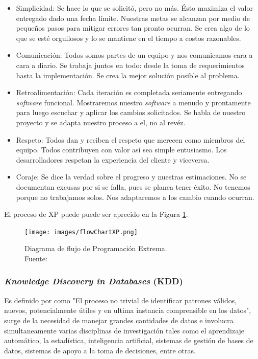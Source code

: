 \begin{itemize}
\item Simplicidad: Se hace lo que se solicitó, pero no más. Ésto maximiza el valor entregado dado una fecha límite. Nuestras metas se alcanzan por medio de pequeños pasos para mitigar errores tan pronto ocurran. Se crea algo de lo que se esté orgullosos y lo se mantiene en el tiempo a costos razonables.
\item Comunicación: Todos somos partes de un equipo y nos comunicamos cara a cara a diario. Se trabaja juntos en todo: desde la toma de requerimientos hasta la implementación. Se crea la mejor solución posible al problema.
\item Retroalimentación: Cada iteración es completada seriamente entregando \textit{software} funcional. Mostraremos nuestro \textit{software} a menudo y prontamente para luego escuchar y aplicar los cambios solicitados. Se habla de nuestro proyecto y se adapta nuestro proceso a el, no al revéz.
\item Respeto: Todos dan y reciben el respeto que merecen como miembros del equipo. Todos contribuyen con valor así sea simple entusiasmo. Los desarrolladores respetan la experiencia del cliente y viceversa. 
\item Coraje: Se dice la verdad sobre el progreso y nuestras estimaciones. No se documentan excusas por si se falla, pues se planea tener éxito. No tenemos porque no trabajamos solos. Nos adaptaremos a los cambio cuando ocurran.
\end{itemize}

El proceso de XP puede puede ser aprecido en la Figura \ref{fig:procesoXP}.

\begin{figure}[H]
	\centering
	\captionsetup{justification=centering}
	\texttt{[image: images/flowChartXP.png]}
	\caption[Diagrama de flujo de Programación Extrema.]{Diagrama de flujo de Programación Extrema.\\Fuente: \cite{XP}}
	\label{fig:procesoXP}
\end{figure}

\subsubsection*{\textit{Knowledge Discovery in Databases} (KDD)}
\label{subsubsec:kdd}

Es definido por \cite{KDDFayyad} como "El proceso no trivial de identificar patrones válidos, nuevos, potencialmente útiles y en ultima instancia comprensible en los datos", surge de la necesidad de manejar grandes cantidades de datos e involucra simultaneamente varias disciplinas de investigación tales como el aprendizaje automático, la estadística, inteligencia artificial, sistemas de gestión de bases de datos, sistemas de apoyo a la toma de decisiones, entre otras.

